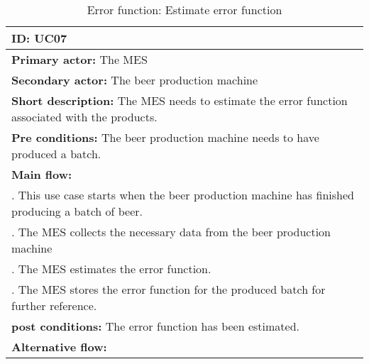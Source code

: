 \begin{table}[ht]
    \begin{tabularx}{\textwidth}{|>{\RaggedRight}X|}
        \hline
        \textbf{ID:} UC07  \\
        \hline
        \textbf{Primary actor:} The MES \\
        \hline
        \textbf{Secondary actor:} The beer production machine \\
        \hline
        \textbf{Short description:} The MES needs to estimate the error function
        associated with the products. \\
        \hline
        \textbf{Pre conditions:} The beer production machine needs to have
        produced a batch. \\
        \hline
        \textbf{Main flow:} \\
        	1. This use case starts when the beer production machine has
        	finished producing a batch of beer. \\
			2. The MES collects the necessary data from the beer production
			machine \\
			3. The MES estimates the error function. \\
			4. The MES stores the error function for the produced batch for
			further reference. \\
		\hline
        \textbf{post conditions:} The error function has been estimated. \\
        \hline
        \textbf{Alternative flow:} \\
        \hline
    \end{tabularx}
    \caption{Error function: Estimate error function}
    \label{table:usecase_errorFunction}
\end{table}

